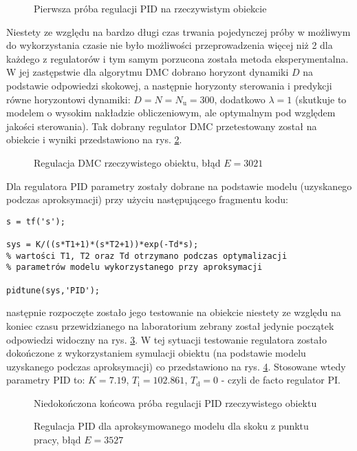 \begin{figure}[ht]
\centering

\caption{Pierwsza próba regulacji PID na rzeczywistym obiekcie}
\label{R4}
\end{figure}
Niestety ze względu na bardzo długi czas trwania pojedynczej próby w możliwym do wykorzystania czasie nie było możliwości przeprowadzenia więcej niż 2 dla każdego z regulatorów i tym samym porzucona została metoda eksperymentalna. W jej zastępstwie dla algorytmu DMC dobrano horyzont dynamiki $D$ na podstawie odpowiedzi skokowej, a następnie horyzonty sterowania i predykcji równe horyzontowi dynamiki: $D=N=N_{\mathrm{u}}=300$, dodatkowo $\lambda=1$ (skutkuje to modelem o wysokim nakładzie obliczeniowym, ale optymalnym pod względem jakości sterowania). Tak dobrany regulator DMC przetestowany został na obiekcie i wyniki przedstawiono na rys. \ref{R5}.

\begin{figure}[ht]
\centering

\caption{Regulacja DMC rzeczywistego obiektu, błąd $E = 3021$}
\label{R5}
\end{figure}
Dla regulatora PID parametry zostały dobrane na podstawie modelu (uzyskanego podczas aproksymacji) przy użyciu następującego fragmentu kodu:

\begin{lstlisting}[style=Matlab-editor]
s = tf('s');

sys = K/((s*T1+1)*(s*T2+1))*exp(-Td*s);
% wartości T1, T2 oraz Td otrzymano podczas optymalizacji
% parametrów modelu wykorzystanego przy aproksymacji

pidtune(sys,'PID');
\end{lstlisting} 

następnie rozpoczęte zostało jego testowanie na obiekcie niestety ze względu na koniec czasu przewidzianego na laboratorium zebrany został jedynie początek odpowiedzi widoczny na rys. \ref{R6}. W tej sytuacji testowanie regulatora zostało dokończone z wykorzystaniem symulacji obiektu (na podstawie modelu uzyskanego podczas aproksymacji) co przedstawiono na rys. \ref{R7}. Stosowane wtedy parametry PID to: $K=\num{7,19}$, $T_\mathrm{i}=\num{102,861}$, $T_\mathrm{d}=0$ - czyli de facto regulator PI.

\begin{figure}[ht]
\centering

\caption{Niedokończona końcowa próba regulacji PID rzeczywistego obiektu}
\label{R6}
\end{figure}

\begin{figure}[ht]
\centering

\caption{Regulacja PID dla aproksymowanego modelu dla skoku z punktu pracy, błąd $E = 3527$}
\label{R7}
\end{figure}
